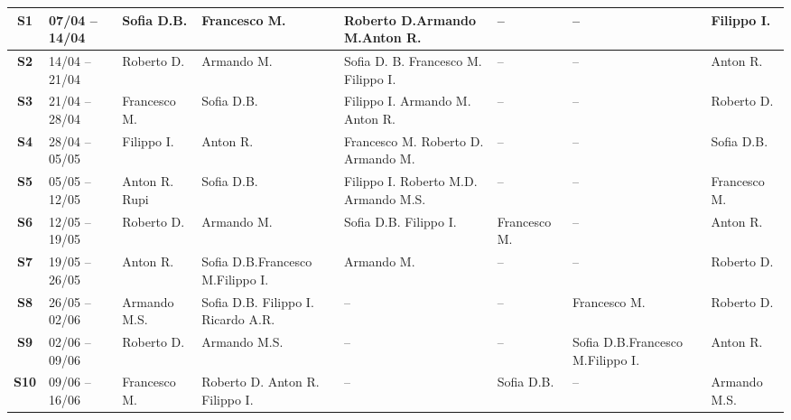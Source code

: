 \begin{longtable}{|cp{1.7cm}|p{1.7cm}|p{1.7cm}|p{1.7cm}|p{1.7cm}|p{1.7cm}|p{1.7cm}|}
    \textbf{S1} & 07/04 -- 14/04 & Sofia D.B. & Francesco M.
       & Roberto D.\newline Armando M.\newline Anton R.
       & -- & -- & Filippo I. \\
    \hline
    \textbf{S2} & 14/04 -- 21/04 & Roberto D. & Armando M. & Sofia D. B. \newline Francesco M. \newline Filippo I. & -- & -- & Anton R. \\
    \hline
    \textbf{S3} & 21/04 -- 28/04 & Francesco M. & Sofia D.B. & Filippo I. \newline Armando M. \newline Anton R. & -- & -- & Roberto D. \\
    \hline
    \textbf{S4} & 28/04 -- 05/05 & Filippo I. & Anton R. & Francesco M. \newline Roberto D. \newline Armando M. & -- & -- & Sofia D.B. \\
    \hline
    \textbf{S5} & 05/05 -- 12/05 & Anton R. Rupi & Sofia D.B. & Filippo I. \newline Roberto M.D. \newline Armando M.S. & -- & -- & Francesco M. \\
    \hline
    \textbf{S6} & 12/05 -- 19/05 & Roberto D.& Armando M. & Sofia D.B. \newline Filippo I. & Francesco M. & -- & Anton R. \\
    \hline
    \textbf{S7} & 19/05 -- 26/05 & Anton R. & Sofia D.B.\newline Francesco M.\newline Filippo I. & Armando M. & -- & -- & Roberto D. \\
    \hline
    \textbf{S8} & 26/05 -- 02/06 & Armando M.S. & Sofia D.B. \newline Filippo I. \newline Ricardo A.R. & -- & -- & Francesco M. & Roberto D. \\
    \hline
    \textbf{S9} & 02/06 -- 09/06 & Roberto D. & Armando M.S. & -- & -- & Sofia D.B.\newline Francesco M.\newline Filippo I. & Anton R. \\
    \hline
    \textbf{S10} & 09/06 -- 16/06 & Francesco M. & Roberto D. \newline Anton R. \newline Filippo I. & -- & Sofia D.B. & -- & Armando M.S. \\

\end{longtable}
